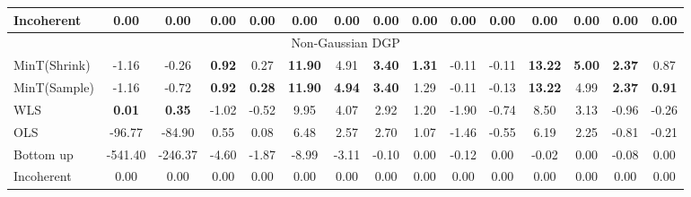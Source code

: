 \documentclass[12pt]{article}
\theoremstyle{definition}
\begin{document}
\begin{table}[H]
{\begin{tabular}{lcccccccccccccc}
			Incoherent & 0.00 & 0.00 & 0.00 & 0.00 & 0.00 & 0.00  & 0.00 & 0.00 & 0.00 & 0.00 & 0.00 & 0.00 & 0.00 & 0.00 \\
			
			\toprule
			\multicolumn{15}{c}{Non-Gaussian DGP}\\
			\toprule
			
			MinT(Shrink) & -1.16 & -0.26 & \textbf{0.92} & 0.27 & \textbf{11.90} & 4.91 & \textbf{3.40} & \textbf{1.31} & -0.11 & -0.11 & \textbf{13.22} & \textbf{5.00} & \textbf{2.37} & 0.87 \\
			
			MinT(Sample) & -1.16 & -0.72 & \textbf{0.92} & \textbf{0.28} & \textbf{11.90} & \textbf{4.94} & \textbf{3.40} & 1.29 & -0.11 & -0.13 & \textbf{13.22} & 4.99 & \textbf{2.37} & \textbf{0.91}\\
			
			WLS & \textbf{0.01} & \textbf{0.35} & -1.02 & -0.52 & 9.95 & 4.07 & 2.92 & 1.20 & -1.90 & -0.74 & 8.50 & 3.13 & -0.96 & -0.26\\
			
			OLS & -96.77 & -84.90 & 0.55 & 0.08 & 6.48 & 2.57 & 2.70 & 1.07 & -1.46 & -0.55 & 6.19 & 2.25 & -0.81 & -0.21\\
			
			Bottom up & -541.40 & -246.37 & -4.60 & -1.87 & -8.99 & -3.11 & -0.10 & 0.00 & -0.12 & 0.00 & -0.02 & 0.00 & -0.08 & 0.00 \\
			
			Incoherent & 0.00 & 0.00 & 0.00 & 0.00 & 0.00 & 0.00 & 0.00 & 0.00 & 0.00 & 0.00 & 0.00 & 0.00 & 0.00 & 0.00 \\
			\bottomrule
		\end{tabular}
	}
\end{table}
\end{document}
